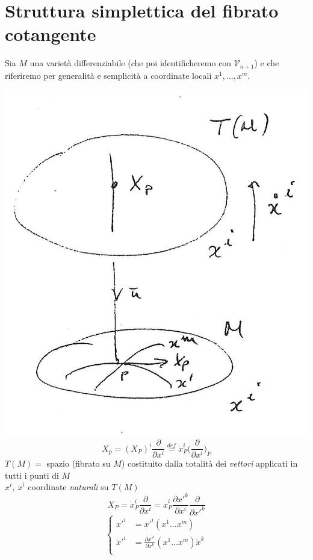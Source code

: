 \section{Struttura simplettica del fibrato cotangente}
\setcounter{equation}{0}

Sia $M$ una varietà differenziabile (che poi identificheremo con $\mathcal{V}_{n+1}$) e che riferiremo per generalità e semplicità a coordinate locali $x^1, \dots , x^m$.
\begin{multicols}{2}
\includegraphics[width=\columnwidth]{media/struttura-simplettica-del-fibrato-cotangente/20-1}
\begin{equation*}
X_p = (X_P)^i \frac{\partial}{\partial x^i} \overset{def}{=} \dot{x}_P^i \bigg( \frac{\partial}{\partial x^i} \bigg)_P
\end{equation*}
$T(M) =$ spazio (fibrato su $M$) costituito dalla totalità dei \textit{vettori} applicati in tutti i punti di $M$
\\
$x^i, ~\dot{x}^i$ \quad coordinate \textit{naturali} su $T (M)$ \\
\begin{equation*}
X_P = \dot{x}_P^i \frac{\partial}{\partial x^i} = \dot{x}_P^i \frac{\partial x'^k}{\partial x^i}\frac{\partial}{\partial x'^k} 
\end{equation*}
\begin{equation*}
\left \{
\begin{aligned}
x'^i &= x'^i(x^1 \dots x^m) \\
\dot{x}'^i &= \frac{\partial x'^i}{\partial x^k} (x^1 \dots x^m) \dot{x}^k \\ 
\end{aligned}
\right.
\end{equation*}


\end{multicols}

